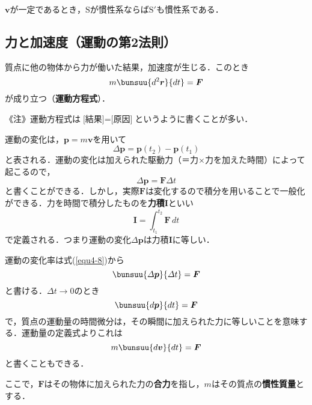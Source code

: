 $\bm{v}$が一定であるとき，$\mathrm{S}$が慣性系ならば$\mathrm{S}'$も慣性系である．



\subsection{力と加速度（運動の第2法則）}
\label{sec4-2-3}

\begin{tcolorbox}[colback=white]
	質点に他の物体から力が働いた結果，加速度が生じる．このとき
	\begin{equation}
		m\bunsuu{d^2\bm{r}}{dt} = \bm{F}
	\end{equation}
が成り立つ（\textbf{運動方程式}）．
\end{tcolorbox}

《注》運動方程式は$\text{[結果]} = \text{[原因]}$というように書くことが多い．

運動の変化は，$\bm{p} = m\bm{v}$を用いて
\begin{equation*}
	\varDelta \bm{p} = \bm{p}(t_2) - \bm{p}(t_1)
\end{equation*}
と表される．運動の変化は加えられた駆動力（＝力×力を加えた時間）によって起こるので，
\begin{equation}
	\label{equ4-8}
	\varDelta \bm{p} = \bm{F}\varDelta t
\end{equation}
と書くことができる．しかし，実際$\bm{F}$は変化するので積分を用いることで一般化ができる．力を時間で積分したものを\textbf{力積}$\bm{I}$といい
\begin{equation*}
	\bm{I} = \int_{t_1}^{t_2} \bm{F}\,dt
\end{equation*}
で定義される．つまり運動の変化$\varDelta\bm{p}$は力積$\bm{I}$に等しい．

運動の変化率は式(\ref{equ4-8})から
\begin{equation*}
	\bunsuu{\varDelta \bm{p}}{\varDelta t} = \bm{F}
\end{equation*}
と書ける．$\varDelta t \to 0$のとき
\begin{equation}
	\bunsuu{d\bm{p}}{dt} = \bm{F}
\end{equation}
で，質点の運動量の時間微分は，その瞬間に加えられた力に等しいことを意味する．運動量の定義式よりこれは
\begin{equation}
	m\bunsuu{d\bm{v}}{dt} = \bm{F}
\end{equation}
と書くこともできる．

ここで，$\bm{F}$はその物体に加えられた力の\textbf{合力}を指し，$m$はその質点の\textbf{慣性質量}とする．

